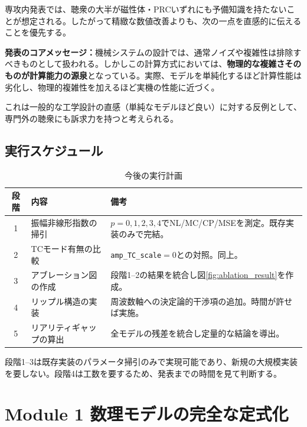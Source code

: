 \documentclass[11pt,a4paper]{ltjsarticle}
\begin{document}
専攻内発表では、聴衆の大半が磁性体・PRCいずれにも予備知識を持たないことが想定される。したがって精緻な数値改善よりも、次の一点を直感的に伝えることを優先する。

\begin{keybox}
\textbf{発表のコアメッセージ：}機械システムの設計では、通常ノイズや複雑性は排除すべきものとして扱われる。しかしこの計算方式においては、\textbf{物理的な複雑さそのものが計算能力の源泉}となっている。実際、モデルを単純化するほど計算性能は劣化し、物理的複雑性を加えるほど実機の性能に近づく。
\end{keybox}

これは一般的な工学設計の直感（単純なモデルほど良い）に対する反例として、専門外の聴衆にも訴求力を持つと考えられる。

\subsection{実行スケジュール}

\begin{table}[htbp]
\centering
\caption{今後の実行計画}
\label{tab:schedule}
\small
\begin{tabular}{@{}clp{72mm}@{}}
\toprule
\textbf{段階} & \textbf{内容} & \textbf{備考} \\
\midrule
1 & 振幅非線形指数の掃引 & $p=0,1,2,3,4$でNL/MC/CP/MSEを測定。既存実装のみで完結。 \\
2 & TCモード有無の比較 & \texttt{amp\_TC\_scale}$=0$との対照。同上。 \\
3 & アブレーション図の作成 & 段階1--2の結果を統合し図\ref{fig:ablation_result}を作成。 \\
4 & リップル構造の実装 & 周波数軸への決定論的干渉項の追加。時間が許せば実施。 \\
5 & リアリティギャップの算出 & 全モデルの残差を統合し定量的な結論を導出。 \\
\bottomrule
\end{tabular}
\end{table}

段階1--3は既存実装のパラメータ掃引のみで実現可能であり、新規の大規模実装を要しない。段階4は工数を要するため、発表までの時間を見て判断する。

\newpage
\appendix

\section{Module 1 数理モデルの完全な定式化}\label{app:module1}
\end{document}
